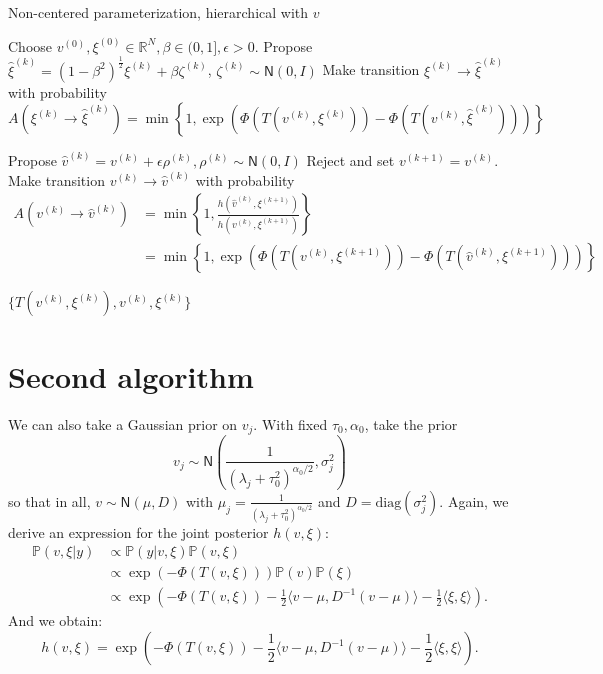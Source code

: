 \documentclass{siamart1116}
\begin{document}
    \begin{algorithm}
    \caption{Non-centered parameterization, hierarchical with $v$}
    \label{alg:hier_v}
    \begin{algorithmic}
    \State Choose $v^{(0)}, \xi^{(0)} \in \mathbb{R}^N, \beta \in (0, 1], \epsilon > 0$.
    \State Propose $\hat\xi^{(k)} = (1-\beta^2)^{\frac{1}{2}}\xi^{(k)} + \beta \zeta^{(k)}$, $\zeta^{(k)} \sim \mathsf{N}(0, I)$
    \State Make transition $\xi^{(k)} \to \hat\xi^{(k)}$ with probability
    \[ A(\xi^{(k)} \to \hat\xi^{(k)}) = \min\left\{1, \exp\left(\Phi(T(v^{(k)}, \xi^{(k)})) - \Phi(T(v^{(k)}, \hat \xi^{(k)}))\right) \right\}\]

    \State Propose $\hat v^{(k)} = v^{(k)} + \epsilon \rho^{(k)}, \rho^{(k)} \sim \mathsf{N}(0,I)$
        \State Reject and set $v^{(k+1)} = v^{(k)}$.
    \Else
    \State Make transition $v^{(k)} \to \hat v^{(k)}$ with probability
    \begin{align*}
     A(v^{(k)} \to \hat v^{(k)}) &= \min\left\{1, \frac{h(\hat v^{(k)}, \xi^{(k+1)})}{h(v^{(k)}, \xi^{(k+1)})}\right\} \\
     &= \min\left\{1, \exp\left(\Phi(T(v^{(k)}, \xi^{(k+1)}))-\Phi(T(\hat v^{(k)}, \xi^{(k+1)})) \right) \right\}
     \end{align*}
    \EndIf

    \EndFor
    \State \Return $\{ T(v^{(k)},\xi^{(k)}), v^{(k)}, \xi^{(k)} \}$
    \end{algorithmic}
    \end{algorithm}

\section{Second algorithm}
    We can also take a Gaussian prior on $v_j$. With fixed $\tau_0, \alpha_0$, take the prior 
    \[v_j \sim \mathsf{N}\left(\frac{1}{(\lambda_j + \tau_0^2)^{\alpha_0/2}},\sigma_j^2\right)\]
    so that in all, $v \sim \mathsf{N}{(\mu, D)}$ with $\mu_j = \frac{1}{(\lambda_j + \tau_0^2)^{\alpha_0/2}}$ and $D = \text{diag}(\sigma_j^2)$. Again, we derive an expression for the joint posterior $h(v,\xi)$:
    \begin{align*}
        \mathbb{P}(v,\xi|y) &\propto \mathbb{P}(y|v,\xi) \mathbb{P}(v,\xi)\\
        &\propto \exp \left(-\Phi(T(v,\xi)) \right) \mathbb{P}(v) \mathbb{P}(\xi)\\
        &\propto \exp \left(-\Phi(T(v,\xi)) -\frac{1}{2}\langle v - \mu, D^{-1}(v - \mu) \rangle -\frac{1}{2} \langle \xi, \xi \rangle\right).
    \end{align*}
    And we obtain:
    \begin{equation}
    h(v,\xi) = \exp \left(-\Phi(T(v,\xi)) -\frac{1}{2}\langle v - \mu, D^{-1}(v - \mu) \rangle -\frac{1}{2} \langle \xi, \xi \rangle\right).
    \end{equation}
\end{document}

